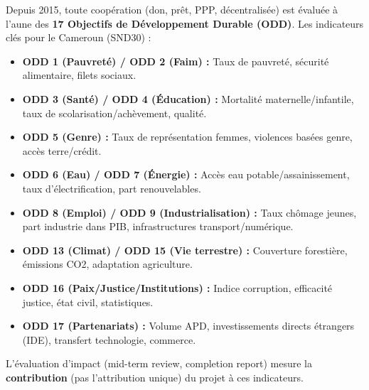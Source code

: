 \documentclass[11pt]{article}
\begin{document}
\begin{propriete}
Depuis 2015, toute coopération (don, prêt, PPP, décentralisée) est évaluée à l'aune des \textbf{17 Objectifs de Développement Durable (ODD)}. Les indicateurs clés pour le Cameroun (SND30) :
\begin{itemize}
    \item \textbf{ODD 1 (Pauvreté) / ODD 2 (Faim) :} Taux de pauvreté, sécurité alimentaire, filets sociaux.
    \item \textbf{ODD 3 (Santé) / ODD 4 (Éducation) :} Mortalité maternelle/infantile, taux de scolarisation/achèvement, qualité.
    \item \textbf{ODD 5 (Genre) :} Taux de représentation femmes, violences basées genre, accès terre/crédit.
    \item \textbf{ODD 6 (Eau) / ODD 7 (Énergie) :} Accès eau potable/assainissement, taux d'électrification, part renouvelables.
    \item \textbf{ODD 8 (Emploi) / ODD 9 (Industrialisation) :} Taux chômage jeunes, part industrie dans PIB, infrastructures transport/numérique.
    \item \textbf{ODD 13 (Climat) / ODD 15 (Vie terrestre) :} Couverture forestière, émissions CO2, adaptation agriculture.
    \item \textbf{ODD 16 (Paix/Justice/Institutions) :} Indice corruption, efficacité justice, état civil, statistiques.
    \item \textbf{ODD 17 (Partenariats) :} Volume APD, investissements directs étrangers (IDE), transfert technologie, commerce.
\end{itemize}
L'évaluation d'impact (mid-term review, completion report) mesure la \textbf{contribution} (pas l'attribution unique) du projet à ces indicateurs.
\end{propriete}
\end{document}
